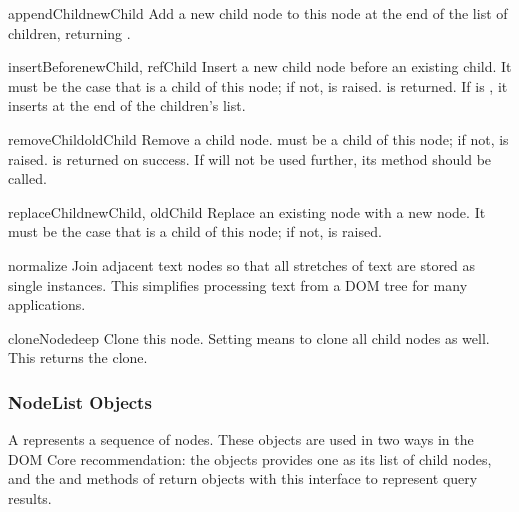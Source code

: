 \begin{methoddesc}[Node]{appendChild}{newChild}
Add a new child node to this node at the end of the list of children,
returning .
\end{methoddesc}

\begin{methoddesc}[Node]{insertBefore}{newChild, refChild}
Insert a new child node before an existing child.  It must be the case
that  is a child of this node; if not,
 is raised.   is returned. If
 is , it inserts  at the end of
the children's list.
\end{methoddesc}

\begin{methoddesc}[Node]{removeChild}{oldChild}
Remove a child node.   must be a child of this node; if
not,  is raised.   is returned on
success.  If  will not be used further, its
 method should be called.
\end{methoddesc}

\begin{methoddesc}[Node]{replaceChild}{newChild, oldChild}
Replace an existing node with a new node. It must be the case that 
 is a child of this node; if not,
 is raised.
\end{methoddesc}

\begin{methoddesc}[Node]{normalize}{}
Join adjacent text nodes so that all stretches of text are stored as
single  instances.  This simplifies processing text from a
DOM tree for many applications.
\end{methoddesc}

\begin{methoddesc}[Node]{cloneNode}{deep}
Clone this node.  Setting  means to clone all child nodes as
well.  This returns the clone.
\end{methoddesc}


\subsubsection{NodeList Objects \label{dom-nodelist-objects}}

A  represents a sequence of nodes.  These objects are
used in two ways in the DOM Core recommendation:  the
 objects provides one as its list of child nodes, and
the  and
 methods of  return
objects with this interface to represent query results.

